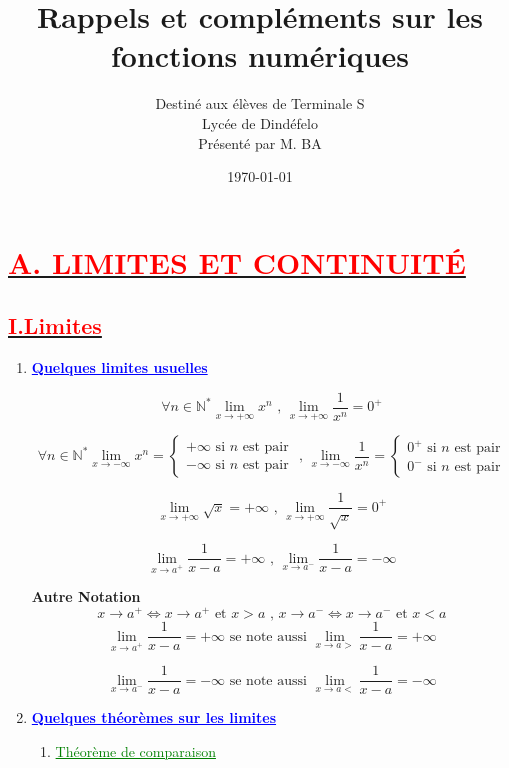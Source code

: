\documentclass[12pt]{article}
\author{Destiné aux élèves de Terminale S\\Lycée de Dindéfelo\\Présenté par M. BA}
\title{\textbf{Rappels et compléments sur les fonctions numériques}}
\date{\today}
\begin{document}
\maketitle
\section*{\underline{\textbf{\textcolor{red}{A. LIMITES ET CONTINUITÉ}}}}
\subsection*{\underline{\textbf{\textcolor{red}{I.Limites}}}}

\renewcommand{\labelenumi}{\theenumi)}
\begin{enumerate}[label=\arabic*)]
    \item \textbf{\textcolor{blue}{\underline{Quelques limites usuelles}}}
    
\[\forall n\in\mathbb{N}^{*} \lim_{x \to +\infty} x^{n} \text{ , } \lim_{x \to +\infty} \frac{1}{x^{n}}=0^{+}  \]

\[ \forall n\in\mathbb{N}^{*}
 \lim_{x \to -\infty} x^{n} =
 \begin{cases} 
 +\infty \text{ si \(n\) est pair}\\
 -\infty \text{ si \(n\) est pair}
 \end{cases}
\text{ , }
\lim_{x \to -\infty} \frac{1}{x^{n}}=
 \begin{cases} 
 0^{+} \text{ si \(n\) est pair}\\
 0^{-} \text{ si \(n\) est pair}
 \end{cases}
\]

\[ \lim_{x \to +\infty} \sqrt{x}=+\infty \text{ , } \lim_{x \to +\infty} \frac{1}{\sqrt{x}}=0^{+}  \]

\[ \lim_{x \to a^{+}} \frac{1}{x-a}=+\infty \text{ , } \lim_{x \to a^{-}} \frac{1}{x-a}=-\infty  \]

		\textbf{Autre Notation}
\[x\rightarrow a^{+} \Leftrightarrow x\rightarrow a^{+} \text{ et } x > a \text{ , } x\rightarrow a^{-} \Leftrightarrow x\rightarrow a^{-} \text{ et } x < a \]
\[ \lim_{x \to a^{+}} \frac{1}{x-a}=+\infty \text{ se note aussi } \lim_{x \to a>} \frac{1}{x-a}=+\infty  \]	

\[ \lim_{x \to a^{-}} \frac{1}{x-a}=-\infty \text{ se note aussi } \lim_{x \to a<} \frac{1}{x-a}=-\infty  \]	
    
    \item	\textbf{\textcolor{blue}{\underline{Quelques théorèmes sur les limites}}}
\begin{enumerate}[label=\alph*)]
       \item \textcolor{green}{\underline{Théorème de comparaison}}
       

\end{enumerate}
\end{enumerate}
\end{document}
